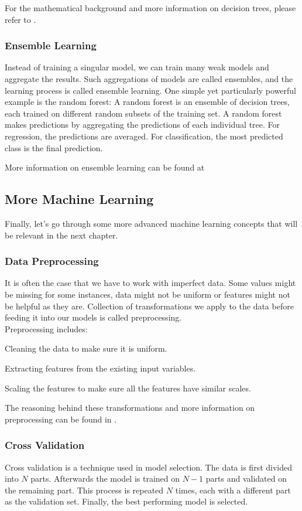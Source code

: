 For the mathematical background and more information on decision trees, please refer to \parencite{homl:6}.

\subsubsection{Ensemble Learning}
Instead of training a singular model, we can train many weak models and aggregate the results.
Such aggregations of models are called ensembles, and the learning process is called ensemble learning.
One simple yet particularly powerful example is the random forest:
A random forest is an ensemble of decision trees, each trained on different random subsets of the training set.
A random forest makes predictions by aggregating the predictions of each individual tree.
For regression, the predictions are averaged.
For classification, the most predicted class is the final prediction.\parencite{homl:7}
 
More information on ensemble learning can be found at \parencite{homl:7}

\subsection{More Machine Learning}
Finally, let's go through some more advanced machine learning concepts that will be relevant in the next chapter.
\subsubsection{Data Preprocessing}
It is often the case that we have to work with imperfect data.
Some values might be missing for some instances, data might not be uniform or features might not be helpful as they are.
Collection of transformations we apply to the data before feeding it into our models is called preprocessing.\parencite{homl:2}\\
Preprocessing includes:

Cleaning the data to make sure it is uniform.

Extracting features from the existing input variables.

Scaling the features to make sure all the features have similar scales.

The reasoning behind these transformations and more information on preprocessing can be found in \parencite{homl:2}.

\subsubsection{Cross Validation}
Cross validation is a technique used in model selection.
The data is first divided into $N$ parts.
Afterwards the model is trained on $N-1$ parts and validated on the remaining part.
This process is repeated $N$ times, each with a different part as the validation set.
Finally, the best performing model is selected.\parencite{ml:prml}
